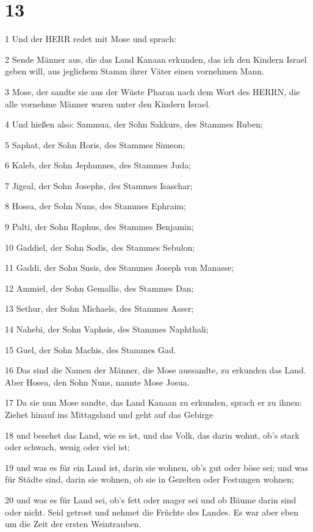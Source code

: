 \chapter{13}

\par 1 Und der HERR redet mit Mose und sprach:
\par 2 Sende Männer aus, die das Land Kanaan erkunden, das ich den Kindern Israel geben will, aus jeglichem Stamm ihrer Väter einen vornehmen Mann.
\par 3 Mose, der sandte sie aus der Wüste Pharan nach dem Wort des HERRN, die alle vornehme Männer waren unter den Kindern Israel.
\par 4 Und hießen also: Sammua, der Sohn Sakkurs, des Stammes Ruben;
\par 5 Saphat, der Sohn Horis, des Stammes Simeon;
\par 6 Kaleb, der Sohn Jephunnes, des Stammes Juda;
\par 7 Jigeal, der Sohn Josephs, des Stammes Isaschar;
\par 8 Hosea, der Sohn Nuns, des Stammes Ephraim;
\par 9 Palti, der Sohn Raphus, des Stammes Benjamin;
\par 10 Gaddiel, der Sohn Sodis, des Stammes Sebulon;
\par 11 Gaddi, der Sohn Susis, des Stammes Joseph von Manasse;
\par 12 Ammiel, der Sohn Gemallis, des Stammes Dan;
\par 13 Sethur, der Sohn Michaels, des Stammes Asser;
\par 14 Nahebi, der Sohn Vaphsis, des Stammes Naphthali;
\par 15 Guel, der Sohn Machis, des Stammes Gad.
\par 16 Das sind die Namen der Männer, die Mose aussandte, zu erkunden das Land. Aber Hosea, den Sohn Nuns, nannte Mose Josua.
\par 17 Da sie nun Mose sandte, das Land Kanaan zu erkunden, sprach er zu ihnen: Ziehet hinauf ins Mittagsland und geht auf das Gebirge
\par 18 und besehet das Land, wie es ist, und das Volk, das darin wohnt, ob's stark oder schwach, wenig oder viel ist;
\par 19 und was es für ein Land ist, darin sie wohnen, ob's gut oder böse sei; und was für Städte sind, darin sie wohnen, ob sie in Gezelten oder Festungen wohnen;
\par 20 und was es für Land sei, ob's fett oder mager sei und ob Bäume darin sind oder nicht. Seid getrost und nehmet die Früchte des Landes. Es war aber eben um die Zeit der ersten Weintrauben.
